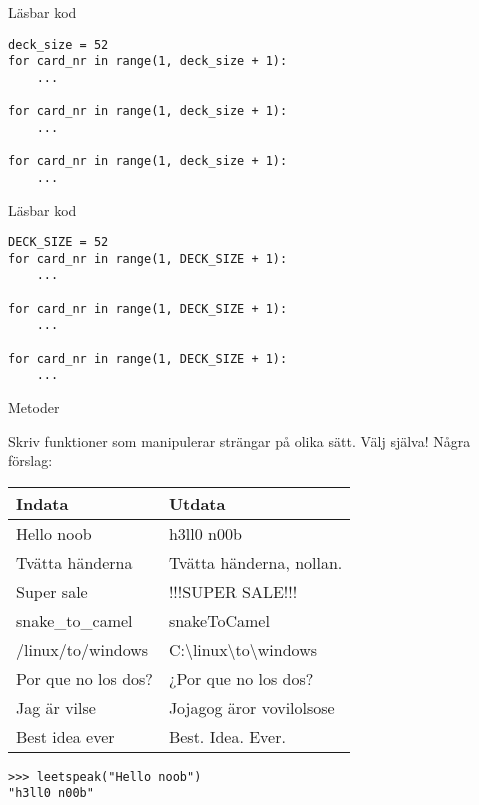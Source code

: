 \documentclass{beamer}
\begin{document}
  \begin{frame}[fragile]{Läsbar kod}

    \begin{verbatim}
deck_size = 52
for card_nr in range(1, deck_size + 1):
    ...

for card_nr in range(1, deck_size + 1):
    ...

for card_nr in range(1, deck_size + 1):
    ...
    \end{verbatim}

  \end{frame}

  \begin{frame}[fragile]{Läsbar kod}

    \begin{verbatim}
DECK_SIZE = 52
for card_nr in range(1, DECK_SIZE + 1):
    ...

for card_nr in range(1, DECK_SIZE + 1):
    ...

for card_nr in range(1, DECK_SIZE + 1):
    ...
    \end{verbatim}

  \end{frame}

  \begin{frame}[fragile]{Metoder}

    Skriv funktioner som manipulerar strängar på olika sätt. Välj själva! \pause{}Några
    förslag:

    {
      \ttfamily
      \begin{tabular}{l l}
        Indata & Utdata \\\toprule
        Hello noob & h3ll0 n00b \\
        Tvätta händerna & Tvätta händerna, nollan. \\
        Super sale & !!!SUPER SALE!!! \\
        snake\_to\_camel & snakeToCamel \\
        /linux/to/windows & C:\textbackslash{}linux\textbackslash{}to\textbackslash{}windows \\
        Por que no los dos? & ¿Por que no los dos? \\
        Jag är vilse & Jojagog äror vovilolsose \\
        Best idea ever & Best. Idea. Ever. \\
      \end{tabular}
    }

    \pause{}

    \begin{verbatim}
>>> leetspeak("Hello noob")
"h3ll0 n00b"
    \end{verbatim}

  \end{frame}
\end{document}
